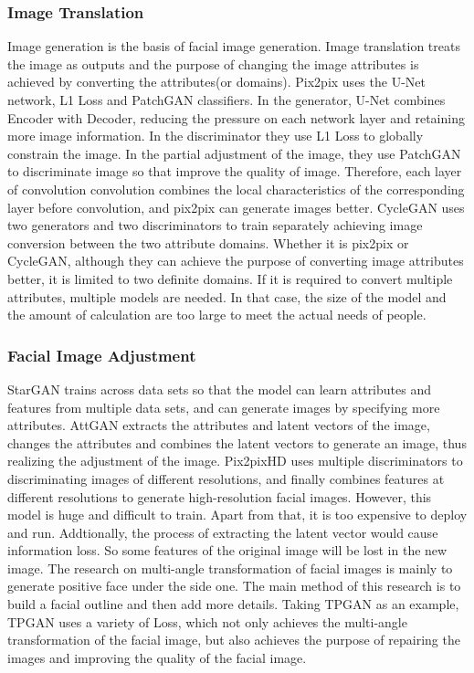 \subsubsection*{Image Translation}
Image generation is the basis of facial image generation.
Image translation treats the image as outputs and the purpose of changing the image attributes is achieved by converting the attributes(or domains).
Pix2pix uses the U-Net network, L1 Loss and PatchGAN classifiers.
In the generator, U-Net combines Encoder with Decoder,
    reducing the pressure on each network layer and retaining more image information.
In the discriminator they use L1 Loss to globally constrain the image.
In the partial adjustment of the image,
    they use PatchGAN to discriminate image so that improve the quality of image.
Therefore, each layer of convolution convolution combines the local characteristics of the corresponding layer before convolution,
    and pix2pix can generate images better.
CycleGAN uses two generators and two discriminators to train separately achieving image conversion between the two attribute domains.
Whether it is pix2pix or CycleGAN,
    although they can achieve the purpose of converting image attributes better,
    it is limited to two definite domains.
If it is required to convert multiple attributes, multiple models are needed.
In that case, the size of the model and the amount of calculation are too large to meet the actual needs of people.

\subsubsection*{Facial Image Adjustment}
StarGAN trains across data sets so that the model can learn attributes and features from multiple data sets,
    and can generate images by specifying more attributes.
AttGAN extracts the attributes and latent vectors of the image,
    changes the attributes and combines the latent vectors to generate an image,
    thus realizing the adjustment of the image.
Pix2pixHD uses multiple discriminators to discriminating images of different resolutions,
    and finally combines features at different resolutions to generate high-resolution facial images.
However, this model is huge and difficult to train.
Apart from that, it is too expensive to deploy and run.
Addtionally, the process of extracting the latent vector would cause information loss.
So some features of the original image will be lost in the new image.
The research on multi-angle transformation of facial images is mainly to generate positive face under the side one.
The main method of this research is to build a facial outline and then add more details.
Taking TPGAN as an example, TPGAN uses a variety of Loss,
    which not only achieves the multi-angle transformation of the facial image,
    but also achieves the purpose of repairing the images and improving the quality of the facial image.


